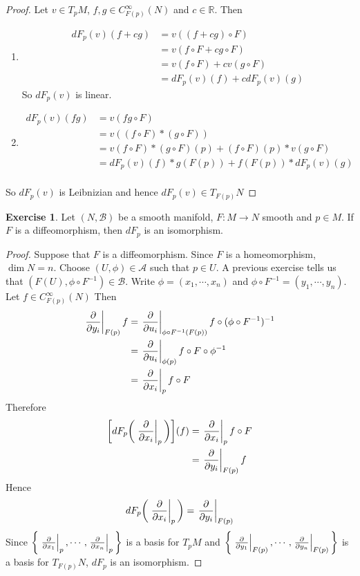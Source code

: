 \documentclass[12pt]{amsart}
\theoremstyle{definition}
\theoremstyle{remark}
\theoremstyle{definition}
\newtheorem{ex}[definition]{Exercise}
\newcommand{\R}{\mathbb{R}}
\newcommand{\MA}{\mathcal{A}}
\newcommand{\MB}{\mathcal{B}}
\begin{document}
	\begin{proof}
	Let $v \in T_pM$, $f,g \in C_{F(p)}^{\infty}(N)$ and $c \in \R$. Then 
	\begin{enumerate}
	\item 
	\begin{align*}
		dF_p(v)(f+cg) 
		&= v((f+cg) \circ F) \\
		&= v(f \circ F + c g \circ F) \\
		&= v(f \circ F) + cv(g \circ F) \\
		&= dF_p(v)(f) + c dF_p(v)(g)
	\end{align*}
	So $dF_p(v)$ is linear.
	\item 
	\begin{align*}
	dF_p(v)(fg) 
	&= v (fg \circ F) \\
	&= v((f \circ F)* (g \circ F)) \\
	&= v(f \circ F)*(g \circ F)(p) +  (f \circ F)(p)* v(g \circ F) \\
	&= dF_p(v)(f) * g(F(p)) + f(F(p))*dF_p(v)(g) \\
	\end{align*}
	\end{enumerate}
	So $dF_p(v)$ is Leibnizian and hence $dF_p(v) \in T_{F(p)}N$
	\end{proof}

	\begin{ex}
		Let $(N, \MB)$ be a smooth manifold, $F: M \rightarrow N$ smooth and $p \in M$. If $F$ is a diffeomorphism, then $dF_p$ is an isomorphism.
	\end{ex}
	
	\begin{proof}
		Suppose that $F$ is a diffeomorphism. Since $F$ is a homeomorphism, $\dim N = n$. Choose $(U, \phi) \in \MA$ such that $p \in U$. A previous exercise tells us that $(F(U), \phi \circ F^{-1}) \in \MB$. Write $\phi = (x_1, \cdots, x_n)$ and $\phi \circ F^{-1} = (y_1, \cdots, y_n)$. Let $f \in C^{\infty}_{F(p)}(N)$ Then 
		\begin{align*}
			\eval{\pdv{y_i}}_{F(p)} f
			&= 	\eval{\pdv{u_i}}_{\phi \circ F^{-1} (F(p))} f \circ (\phi \circ F^{-1})^{-1} \\
			&= 	\eval{\pdv{u_i}}_{\phi(p)} f \circ F \circ \phi^{-1} \\
			&= 	\eval{\pdv{x_i}}_p f \circ F \\
		\end{align*}
		Therefore 
		\begin{align*}
			\bigg[ dF_p \bigg( \eval{\pdv{x_i}}_p \bigg) \bigg] (f)
			&= \eval{\pdv{x_i}}_p f \circ F \\
			&= \eval{\pdv{y_i}}_{F(p)} f 
		\end{align*}
	Hence $$dF_p \bigg( \eval{\pdv{x_i}}_p \bigg) = \eval{\pdv{y_i}}_{F(p)}$$ 
	Since $\bigg \{\eval{\pdv{x_1}}_{p}, \cdots, \eval{\pdv{x_n}}_{p} \bigg \}$ is a basis for $T_pM$ and $\bigg \{\eval{\pdv{y_1}}_{F(p)}, \cdots, \eval{\pdv{y_n}}_{F(p)} \bigg \}$ is a basis for $T_{F(p)}N$, $dF_p$ is an isomorphism.
	\end{proof}
\end{document}
